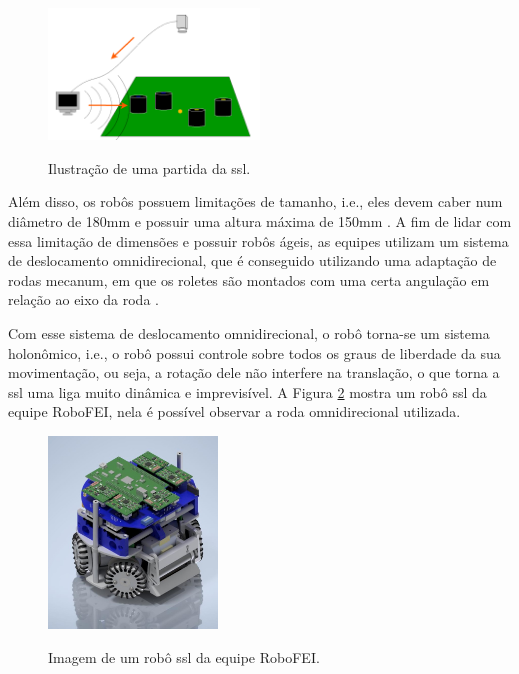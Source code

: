 \documentclass[acronym, symbols, table]{fei}
\begin{document}
		\begin{figure}[!htb]
			\centering
			\caption{Ilustração de uma partida da \acrshort{ssl}.} 
			\includegraphics[width=0.5\textwidth]{funcionamento_ssl.png}
			\label{fig:ilustracao_partida_ssl}
		\end{figure}
		
		Além disso, os robôs possuem limitações de tamanho, i.e., eles devem caber num diâmetro de 180mm e possuir uma altura máxima de 150mm \cite{rules}. A fim de lidar com essa limitação de dimensões e possuir robôs ágeis, as equipes utilizam um sistema de deslocamento omnidirecional, que é conseguido utilizando uma adaptação de rodas mecanum, em que os roletes são montados com uma certa angulação em relação ao eixo da roda \cite{aguiarreformulaccao}.
		
		Com esse sistema de deslocamento omnidirecional, o robô torna-se um sistema holonômico, i.e., o robô possui controle sobre todos os graus de liberdade da sua movimentação, ou seja, a rotação dele não interfere na translação, o que torna a \acrshort{ssl} uma liga muito dinâmica e imprevisível. A Figura \ref{fig:exemplo_robo_ssl} mostra um robô \acrshort{ssl} da equipe RoboFEI, nela é possível observar a roda omnidirecional utilizada.
		
		\begin{figure}[!htb]
			\centering
			\caption{Imagem de um robô \acrshort{ssl} da equipe RoboFEI.} 
			\includegraphics[width=0.4\textwidth]{Foto_Robo_2012.jpg}
			\label{fig:exemplo_robo_ssl}
		\end{figure}
		
\end{document}
